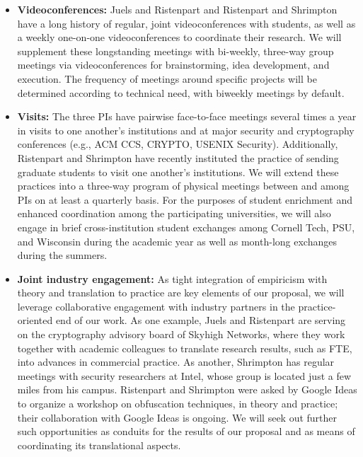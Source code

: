 \begin{itemize}
\item{\bf Videoconferences:} Juels and Ristenpart and Ristenpart and Shrimpton have a long history of regular, joint videoconferences with students, as well as a weekly one-on-one videoconferences to coordinate their research. We will supplement these longstanding meetings with bi-weekly, three-way group meetings via videoconferences for brainstorming, idea development, and execution. The frequency of meetings around specific projects will be determined according to technical need, with biweekly meetings by default. 

\item{\bf Visits:} The three PIs have pairwise face-to-face meetings several times a year in visits to one another's institutions and at major security and cryptography conferences (e.g., ACM CCS, CRYPTO, USENIX Security). Additionally, Ristenpart and Shrimpton have recently instituted the practice of sending graduate students to visit one another's institutions. We will extend these practices into a three-way program of physical meetings between and among PIs on at least a quarterly basis. For the purposes of student enrichment and enhanced coordination among the participating universities, we will also engage in brief cross-institution student exchanges among Cornell Tech, PSU, and Wisconsin during the academic year as well as month-long exchanges during the summers.

\item{\bf Joint industry engagement:} As tight integration of empiricism with theory and translation to practice are key elements of our proposal, we will leverage collaborative engagement with industry partners in the practice-oriented end of our work. As one example, Juels and Ristenpart are serving on the cryptography advisory board of Skyhigh Networks, where they work together with academic colleagues to translate research results, such as FTE, into advances in commercial practice. As another, Shrimpton has regular meetings with security researchers at Intel, whose group is located just a few miles from his campus.  Ristenpart and Shrimpton were asked by Google Ideas to organize a workshop on obfuscation techniques, in theory and practice; their collaboration with Google Ideas is ongoing.  We will seek out further such opportunities as conduits for the results of our proposal and as means of coordinating its translational aspects.
\end{itemize}

